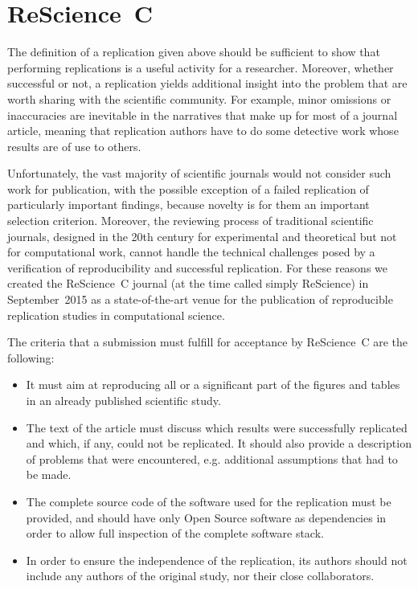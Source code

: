 \documentclass[runningheads]{llncs}
\begin{document}
\section{ReScience~C}

The definition of a replication given above should be sufficient to show that performing replications is a useful activity for a researcher. Moreover, whether successful or not, a replication yields additional insight into the problem that are worth sharing with the scientific community. For example, minor omissions or inaccuracies are inevitable in the narratives that make up for most of a journal article, meaning that replication authors have to do some detective work whose results are of use to others.

Unfortunately, the vast majority of scientific journals would not consider such work for publication, with the possible exception of a failed replication of particularly important findings, because novelty is for them an important selection criterion. Moreover, the reviewing process of traditional scientific journals, designed in the 20th century for experimental and theoretical but not for computational work, cannot handle the technical challenges posed by a verification of reproducibility and successful replication. For these reasons we created the ReScience~C journal (at the time called simply ReScience) in September~2015 as a state-of-the-art venue for the publication of reproducible replication studies in computational science.

The criteria that a submission must fulfill for acceptance by ReScience~C are the following:
\begin{itemize}
\item It must aim at reproducing all or a significant part of the figures and tables in an already published scientific study.
\item The text of the article must discuss which results were successfully replicated and which, if any, could not be replicated. It should also provide a description of problems that were encountered, e.g. additional assumptions that had to be made.
\item The complete source code of the software used for the replication must be provided, and should have only Open Source software as dependencies in order to allow full inspection of the complete software stack.
\item In order to ensure the independence of the replication, its authors should not include any authors of the original study, nor their close collaborators.
\end{itemize}
\end{document}
